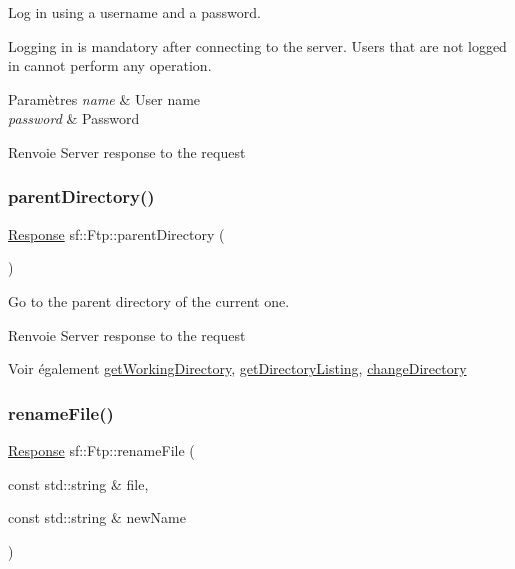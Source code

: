Log in using a username and a password. 

Logging in is mandatory after connecting to the server. Users that are not logged in cannot perform any operation.


\begin{DoxyParams}{Paramètres}
{\em name} & User name \\
\hline
{\em password} & Password\\
\hline
\end{DoxyParams}
\begin{DoxyReturn}{Renvoie}
Server response to the request 
\end{DoxyReturn}
\mbox{\label{classsf_1_1Ftp_ad295cf77f30f9ad07b5c401fd9849189}} 
\subsubsection{\texorpdfstring{parent\+Directory()}{parentDirectory()}}
{\footnotesize\ttfamily \hyperlink{classsf_1_1Ftp_1_1Response}{Response} sf\+::\+Ftp\+::parent\+Directory (\begin{DoxyParamCaption}{ }\end{DoxyParamCaption})}



Go to the parent directory of the current one. 

\begin{DoxyReturn}{Renvoie}
Server response to the request
\end{DoxyReturn}
\begin{DoxySeeAlso}{Voir également}
\hyperlink{classsf_1_1Ftp_a79c654fcdd0c81e68c4fa29af3b45e0c}{get\+Working\+Directory}, \hyperlink{classsf_1_1Ftp_a8f37258e461fcb9e2a0655e9df0be4a0}{get\+Directory\+Listing}, \hyperlink{classsf_1_1Ftp_a7e93488ea6330dd4dd76e428da9bb6d3}{change\+Directory} 
\end{DoxySeeAlso}
\mbox{\label{classsf_1_1Ftp_a8f99251d7153e1dc26723e4006deb764}} 
\subsubsection{\texorpdfstring{rename\+File()}{renameFile()}}
{\footnotesize\ttfamily \hyperlink{classsf_1_1Ftp_1_1Response}{Response} sf\+::\+Ftp\+::rename\+File (\begin{DoxyParamCaption}\item[{const std\+::string \&}]{file,  }\item[{const std\+::string \&}]{new\+Name }\end{DoxyParamCaption})}



